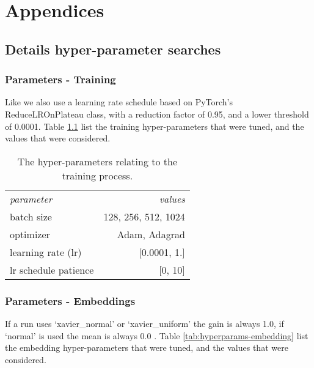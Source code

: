\chapter{Appendices}
\label{ch:appendices}

\clearpage
\section{Details hyper-parameter searches}
\label{apx:hyperparameter_search}


\subsection{Parameters - Training}
Like \citeauthor{ruffinelli_you_2019} we also use a learning rate schedule based on PyTorch's ReduceLROnPlateau class, with a reduction factor of 0.95, and a lower threshold of 0.0001.
Table \ref{tab:hyperparams-training} list the training hyper-parameters that were tuned, and the values that were considered.

\begin{table}[h!]
    \centering
    \begin{tabular}{lr}
        \toprule
        \textit{parameter}  & \textit{values}               \\
        \cmidrule{1-2}
        batch size          & 128, 256, 512, 1024              \\
        optimizer           & Adam, Adagrad                 \\
        learning rate (lr)  & [0.0001, 1.]                  \\
        lr schedule patience& [0, 10]                       \\
        \bottomrule
    \end{tabular}
    \label{tab:hyperparams-training}
    \caption{The hyper-parameters relating to the training process.}
\end{table}

\subsection{Parameters - Embeddings}
If a run uses `xavier\_normal' or `xavier\_uniform' the gain is always 1.0, if `normal' is used the mean is always 0.0 .
Table \ref{tab:hyperparams-embedding} list the embedding hyper-parameters that were tuned, and the values that were considered.

